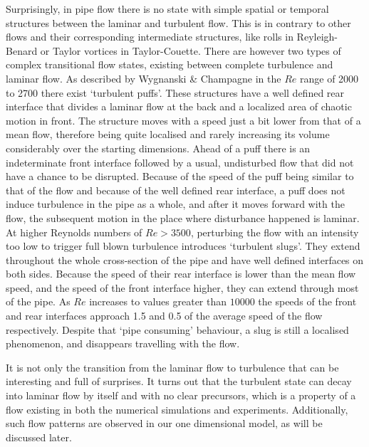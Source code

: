 \documentclass[11pt,a4paper]{article}
\begin{document}
Surprisingly, in pipe flow there is no state with simple spatial or temporal structures between the laminar and turbulent flow\cite{Eckhardt07}.
This is in contrary to other flows and their corresponding intermediate structures, like rolls in Reyleigh-Benard or Taylor vortices in Taylor-Couette.
There are however two types of complex transitional flow states, existing between complete turbulence and laminar flow.
As described by Wygnanski \& Champagne\cite{Wygnanski73} in the \(Re\) range of 2000 to 2700 there exist `turbulent puffs'.
These structures have a well defined rear interface that divides a laminar flow at the back and a localized area of chaotic motion in front.
The structure moves with a speed just a bit lower from that of a mean flow, therefore being quite localised and rarely increasing its volume considerably over the starting dimensions.
Ahead of a puff there is an indeterminate front interface followed by a usual, undisturbed flow that did not have a chance to be disrupted.
Because of the speed of the puff being similar to that of the flow and because of the well defined rear interface, a puff does not induce turbulence in the pipe as a whole, and after it moves forward with the flow, the subsequent motion in the place where disturbance happened is laminar.
At higher Reynolds numbers of \(Re > 3500\), perturbing the flow with an intensity too low to trigger full blown turbulence introduces `turbulent slugs'.
They extend throughout the whole cross-section of the pipe and have well defined interfaces on both sides.
Because the speed of their rear interface is lower than the mean flow speed, and the speed of the front interface higher, they can extend through most of the pipe.
As \(Re\) increases to values greater than \(10000\) the speeds of the front and rear interfaces approach 1.5 and 0.5 of the average speed of the flow respectively.
Despite that `pipe consuming' behaviour, a slug is still a localised phenomenon, and disappears travelling with the flow.

It is not only the transition from the laminar flow to turbulence that can be interesting and full of surprises.
It turns out that the turbulent state can decay into laminar flow by itself and with no clear precursors, which is a property of a flow existing in both the numerical simulations\cite{Brosa89}\cite{Faisst04} and experiments\cite{Darbyshire95}\cite{Hof04}\cite{Mullin06}.
Additionally, such flow patterns are observed in our one dimensional model, as will be discussed later.
\end{document}
